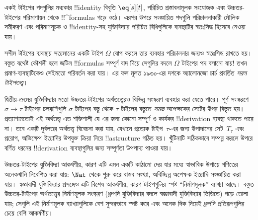 \documentclass[../../../include/open-logic-section]{subfiles}
\begin{document}
একই টাইপের পদগুলির মধ্যকার !!{identity} বিবৃতি $\eq[s][t]$, পরিচিত
প্রস্তাবনামূলক সংযোজক এবং উচ্চতর-টাইপের পরিমাণায়ন থেকে
!!^{formula}s গড়ে ওঠে। এরপর উপরে সংজ্ঞায়িত পদগুলি পরিচালনাকারী মৌলিক
সমীকরণ এবং পরিমাণসূচক ও !!{identity}-সহ যুক্তিবিদ্যার পরিচিত বিধিগুলিকে
ব্যবস্থাটির স্বতঃসিদ্ধ হিসেবে নেওয়া যায়।

সসীম টাইপের ব্যবস্থায় সত্যমানের একটি টাইপ $\Omega$ যোগ করলে তার
ব্যবহার পরিচালনার জন্যও স্বতঃসিদ্ধ রাখতে হয়। বস্তুত যথেষ্ট কৌশলী হলে
জটিল !!{formula}s সম্পূর্ণ বাদ দিয়ে সেগুলির বদলে $\Omega$ টাইপের পদ
বসানো যায়!{} তখন প্রমাণ-ব্যবস্থাটিকেও সেইমতো পরিবর্তন করা যায়। এর
ফল মূলত ১৯৩০-এর দশকে অ্যালোনজো চার্চ প্রবর্তিত \emph{সরল
টাইপতত্ত্ব}।

দ্বিতীয়-ক্রমের যুক্তিবিদ্যার মতো উচ্চতর-টাইপের অর্থতত্ত্বেরও বিভিন্ন
সংস্করণ ব্যবহার করা যেতে পারে। পূর্ণ সংস্করণে $\sigma \to \tau$
টাইপের চলরাশিগুলি $\sigma$ টাইপের বস্তু থেকে $\tau$ টাইপের বস্তুতে
\emph{সমস্ত} অপেক্ষকের সেটের উপর বিস্তৃত হয়। প্রত্যাশামতোই এই
অর্থতত্ত্ব এত শক্তিশালী যে এর জন্য কোনো সম্পূর্ণ ও কার্যকর
!!{derivation} ব্যবস্থা থাকতে পারে না। তবে একটি দুর্বলতর অর্থতত্ত্ব
বিবেচনা করা যায়, যেখানে প্রত্যেক টাইপ~$\tau$-এর জন্য উপাদানের
সেট~$T_\tau$ এবং প্রয়োগ, অভিক্ষেপ ইত্যাদির উপযুক্ত ক্রিয়া নিয়ে
!!a{structure} গঠিত হয়। খুঁটিনাটি সঠিকভাবে সম্পন্ন করলে উপরে বর্ণিত
ধরনের !!{derivation} ব্যবস্থাগুলির জন্য সম্পূর্ণতা উপপাদ্য পাওয়া যায়।

উচ্চতর-টাইপের যুক্তিবিদ্যা আকর্ষণীয়, কারণ এটি এমন একটি কাঠামো দেয়
যার মধ্যে স্বাভাবিক উপায়ে গণিতের অনেকখানি নিবেশিত করা যায়: $\Nat$
থেকে শুরু করে বাস্তব সংখ্যা, অবিচ্ছিন্ন অপেক্ষক ইত্যাদি সংজ্ঞায়িত করা
যায়। স্বজ্ঞাবাদী যুক্তিবিদ্যার প্রসঙ্গেও এটি বিশেষ আকর্ষণীয়, কারণ
টাইপগুলির স্পষ্ট “নির্মাণমূলক” ব্যাখ্যা আছে। বস্তুত উচ্চতর-টাইপের
অর্থতত্ত্বের নির্মাণমূলক সংস্করণ (ধ্রুপদি যুক্তিবিদ্যার বদলে স্বজ্ঞাবাদী
যুক্তিবিদ্যার ভিত্তিতে) গড়ে তোলা যায়; সেগুলি এই নির্মাণমূলক
ব্যাখ্যাগুলিকে বেশ সুন্দরভাবে স্পষ্ট করে এবং অনেক দিক দিয়েই ধ্রুপদি
প্রতিরূপগুলির চেয়ে বেশি আকর্ষণীয়।
\end{document}
